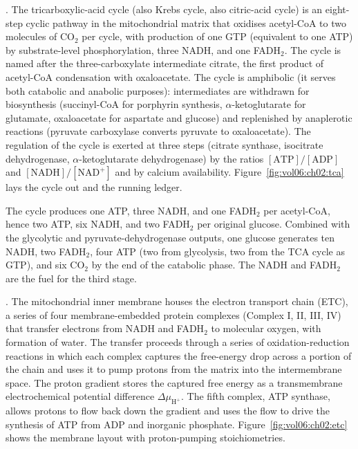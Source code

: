 . The tricarboxylic-acid cycle (also Krebs
cycle, also citric-acid cycle) is an eight-step cyclic pathway in the
mitochondrial matrix that oxidises acetyl-CoA to two molecules of
CO$_2$ per cycle, with production of one GTP (equivalent to one ATP)
by substrate-level phosphorylation, three NADH, and one FADH$_2$. The
cycle is named after the three-carboxylate intermediate citrate, the
first product of acetyl-CoA condensation with oxaloacetate. The cycle
is amphibolic (it serves both catabolic and anabolic purposes):
intermediates are withdrawn for biosynthesis (succinyl-CoA for
porphyrin synthesis, $\alpha$-ketoglutarate for glutamate, oxaloacetate
for aspartate and glucose) and replenished by anaplerotic reactions
(pyruvate carboxylase converts pyruvate to oxaloacetate). The
regulation of the cycle is exerted at three steps (citrate synthase,
isocitrate dehydrogenase, $\alpha$-ketoglutarate dehydrogenase) by
the ratios $[\text{ATP}]/[\text{ADP}]$ and $[\text{NADH}]/[\text{NAD}^+]$
and by calcium availability. Figure~\ref{fig:vol06:ch02:tca} lays the
cycle out and the running ledger.



The cycle produces one ATP, three NADH, and one FADH$_2$ per
acetyl-CoA, hence two ATP, six NADH, and two FADH$_2$ per original
glucose. Combined with the glycolytic and pyruvate-dehydrogenase
outputs, one glucose generates ten NADH, two FADH$_2$, four ATP
(two from glycolysis, two from the TCA cycle as GTP), and six CO$_2$
by the end of the catabolic phase. The NADH and FADH$_2$ are the
fuel for the third stage.

. The mitochondrial inner membrane
houses the electron transport chain (ETC), a series of four
membrane-embedded protein complexes (Complex I, II, III, IV) that
transfer electrons from NADH and FADH$_2$ to molecular oxygen, with
formation of water. The transfer proceeds through a series of
oxidation-reduction reactions in which each complex captures the
free-energy drop across a portion of the chain and uses it to pump
protons from the matrix into the intermembrane space. The proton
gradient stores the captured free energy as a transmembrane
electrochemical potential difference $\Delta \mu_{\text{H}^+}$. The
fifth complex, ATP synthase, allows protons to flow back down the
gradient and uses the flow to drive the synthesis of ATP from ADP
and inorganic phosphate. Figure~\ref{fig:vol06:ch02:etc} shows the
membrane layout with proton-pumping stoichiometries.

